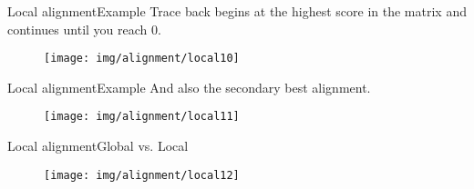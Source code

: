 \documentclass[10pt]{beamer}
\newcommand{\1}{
	\setbeamertemplate{background}{
		\texttt{[image: img/1]}
		\tikz[overlay] \fill[fill opacity=0.75,fill=white] (0,0) rectangle (-\paperwidth,\paperheight);
	}
}
\begin{document}
\begin{frame}{Local alignment}{Example}	
	Trace back begins at the highest score in	the matrix and continues until you reach 0.
	\begin{figure}[]
		\centering
		\texttt{[image: img/alignment/local10]}
		\label{img:uniprot}
	\end{figure}
\end{frame}

\begin{frame}{Local alignment}{Example}	
	And also the secondary best alignment.
	\begin{figure}[]
		\centering
		\texttt{[image: img/alignment/local11]}
		\label{img:uniprot}
	\end{figure}
\end{frame}

\begin{frame}{Local alignment}{Global vs. Local}	

	\begin{figure}[]
		\centering
		\texttt{[image: img/alignment/local12]}
		\label{img:uniprot}
	\end{figure}
\end{frame}



\end{document}
